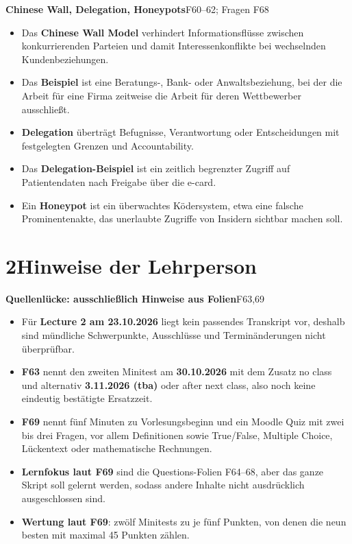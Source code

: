 \documentclass[11pt,a4paper]{article}
\newcommand{\block}[2]{\par\vspace{5pt}\textbf{#1}\hfill{\scriptsize #2}\par\nopagebreak}
\begin{document}
\block{Chinese Wall, Delegation, Honeypots}{F60--62; Fragen F68}
\begin{itemize}
\item Das \textbf{Chinese Wall Model} verhindert Informationsflüsse zwischen konkurrierenden Parteien und damit Interessenkonflikte bei wechselnden Kundenbeziehungen.
\item Das \textbf{Beispiel} ist eine Beratungs-, Bank- oder Anwaltsbeziehung, bei der die Arbeit für eine Firma zeitweise die Arbeit für deren Wettbewerber ausschließt.
\item \textbf{Delegation} überträgt Befugnisse, Verantwortung oder Entscheidungen mit festgelegten Grenzen und Accountability.
\item Das \textbf{Delegation-Beispiel} ist ein zeitlich begrenzter Zugriff auf Patientendaten nach Freigabe über die e-card.
\item Ein \textbf{Honeypot} ist ein überwachtes Ködersystem, etwa eine falsche Prominentenakte, das unerlaubte Zugriffe von Insidern sichtbar machen soll.
\end{itemize}

\newpage
\section*{2\quad Hinweise der Lehrperson}
\block{Quellenlücke: ausschließlich Hinweise aus Folien}{F63,69}
\begin{itemize}
\item Für \textbf{Lecture 2 am 23.10.2026} liegt kein passendes Transkript vor, deshalb sind mündliche Schwerpunkte, Ausschlüsse und Terminänderungen nicht überprüfbar.
\item \textbf{F63} nennt den zweiten Minitest am \textbf{30.10.2026} mit dem Zusatz \glqq no class\grqq{} und alternativ \textbf{3.11.2026 (tba)} oder \glqq after next class\grqq{}, also noch keine eindeutig bestätigte Ersatzzeit.
\item \textbf{F69} nennt fünf Minuten zu Vorlesungsbeginn und ein Moodle Quiz mit zwei bis drei Fragen, vor allem Definitionen sowie True/False, Multiple Choice, Lückentext oder mathematische Rechnungen.
\item \textbf{Lernfokus laut F69} sind die Questions-Folien F64--68, aber das ganze Skript soll gelernt werden, sodass andere Inhalte nicht ausdrücklich ausgeschlossen sind.
\item \textbf{Wertung laut F69}: zwölf Minitests zu je fünf Punkten, von denen die neun besten mit maximal 45 Punkten zählen.
\end{itemize}
\end{document}
